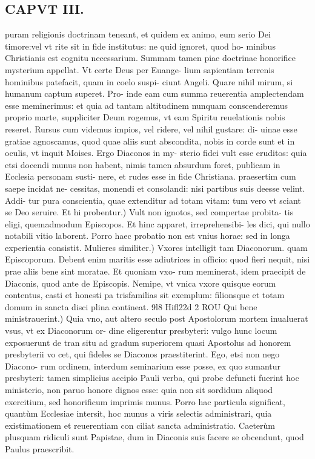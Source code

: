 \documentclass{article}
\begin{document}
\begin{pages}
\section*{CAPVT III. }
\marginpar{[ p.37 ]}\pstart puram religionis doctrinam teneant, et quidem ex animo, eum serio Dei timore:vel vt rite sit in fide institutus: ne quid ignoret, quod ho- minibus Christianis est cognitu necessarium. Summam tamen piae doctrinae honorifice mysterium appellat. Vt certe Deus per Euange- lium sapientiam terrenis hominibus patefacit, quam in coelo suspi- ciunt Angeli. Quare nihil mirum, si humanum captum superet. Pro- inde eam cum summa reuerentia amplectendam esse meminerimus: et quia ad tantam altitudinem nunquam conscenderemus proprio marte, suppliciter Deum rogemus, vt eam Spiritu reuelationis nobis reseret. Rursus cum videmus impios, vel ridere, vel nihil gustare: di- uinae esse gratiae agnoscamus, quod quae aliis sunt abscondita, nobis in corde sunt et in oculis, vt inquit Moises. Ergo Diaconos in my- sterio fidei vult esse eruditos: quia etsi docendi munus non habent, nimis tamen absurdum foret, publicam in Ecclesia personam susti- nere, et rudes esse in fide Christiana. praesertim cum saepe incidat ne- cessitas, monendi et consolandi: nisi partibus suis deesse velint. Addi- tur pura conscientia, quae extenditur ad totam vitam: tum vero vt sciant se Deo seruire.  \pend\pstart Et hi probentur.) Vult non ignotos, sed compertae probita- tis eligi, quemadmodum Episcopos. Et hinc apparet, irreprehensibi- les dici, qui nullo notabili vitio laborent. Porro haec probatio non est vnius horae: sed in longa experientia consistit.  \pend\pstart Mulieres similiter.) Vxores intelligit tam Diaconorum. quam Episcoporum. Debent enim maritis esse adiutrices in officio: quod fieri nequit, nisi prae aliis bene sint moratae. Et quoniam vxo- rum meminerat, idem praecipit de Diaconis, quod ante de Episcopis. Nemipe, vt vnica vxore quisque eorum contentus, casti et honesti pa trisfamilias sit exemplum: filionsque et totam domum in sancta disci plina contineat. 9l8 Hifl22d 2 ROU  \pend\pstart Qui bene ministrauerint.) Quia vno, aut altero seculo post Apostolorum mortem inualuerat vsus, vt ex Diaconorum or- dine eligerentur presbyteri: vulgo hunc locum exposuerunt de tran situ ad gradum superiorem quasi Apostolus ad honorem presbyterii vo cet, qui fideles se Diaconos praestiterint. Ego, etsi non nego Diacono- rum ordinem, interdum seminarium esse posse, ex quo sumantur presbyteri: tamen simplicius accipio Pauli verba, qui probe defuncti fuerint hoc ministerio, non paruo honore dignos esse: quia non sit sordidum aliquod exercitium, sed honorificum imprimis munus. Porro hac particula significat, quantùm Ecclesiae intersit, hoc munus a viris selectis administrari, quia existimationem et reuerentiam con ciliat sancta administratio. Caeterùm plusquam ridiculi sunt Papistae, dum in Diaconis suis facere se obcendunt, quod Paulus praescribit.  \pend

\end{pages}
\end{document}
